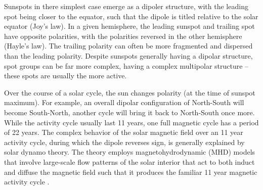 Sunspots in there simplest case emerge as a dipoler structure, with the leading spot being closer to the equator, such that the dipole is titled relative to the solar equator (Joy's law). In a given hemisphere, the leading sunspot and trailing spot have opposite polarities, with the polarities reversed in the other hemisphere (Hayle's law). The trailing polarity can often be more fragmented and dispersed than the leading polarity. Despite sunspots generally having a dipolar structure, spot groups can be far more complex, having a complex multipolar structure -- these spots are usually the more active.

Over the course of a solar cycle, the sun changes polarity (at the time of sunspot maximum). For example, an overall dipolar configuration of North-South will become South-North, another cycle will bring it back to North-South once more. While the activity cycle usually last 11 years, one full magnetic cycle has a period of 22 years. The complex behavior of the solar magnetic field over an 11 year activity cycle, during which the dipole reverses sign, is generally explained by solar dynamo theory. The theory employs magnetohydrodynamic (MHD) models that involve large-scale flow patterns of the solar interior that act to both induct and diffuse the magnetic field such that it produces the familiar 11 year magnetic activity cycle \citep{charbon2010}. 


